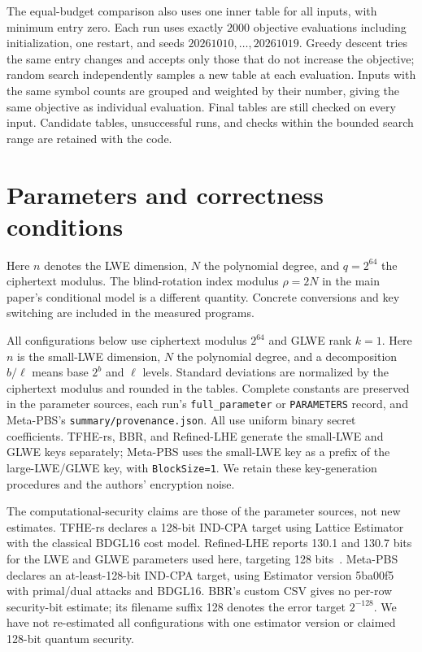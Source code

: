 \documentclass[11pt,a4paper]{article}
\begin{document}
The equal-budget comparison also uses one inner table for all inputs, with minimum entry zero. Each run uses exactly $2000$ objective evaluations including initialization, one restart, and seeds $20261010,\ldots,20261019$. Greedy descent tries the same entry changes and accepts only those that do not increase the objective; random search independently samples a new table at each evaluation. Inputs with the same symbol counts are grouped and weighted by their number, giving the same objective as individual evaluation. Final tables are still checked on every input. Candidate tables, unsuccessful runs, and checks within the bounded search range are retained with the code.



\section{Parameters and correctness conditions}\label{app:parameters}
Here $n$ denotes the LWE dimension, $N$ the polynomial degree, and $q=2^{64}$ the ciphertext modulus. The blind-rotation index modulus $\rho=2N$ in the main paper's conditional model is a different quantity. Concrete conversions and key switching are included in the measured programs.

All configurations below use ciphertext modulus $2^{64}$ and GLWE rank $k=1$. Here $n$ is the small-LWE dimension, $N$ the polynomial degree, and a decomposition $b/\ell$ means base $2^b$ and $\ell$ levels. Standard deviations are normalized by the ciphertext modulus and rounded in the tables. Complete constants are preserved in the parameter sources, each run's \texttt{full\_parameter} or \texttt{PARAMETERS} record, and Meta-PBS's \texttt{summary/provenance.json}. All use uniform binary secret coefficients. TFHE-rs, BBR, and Refined-LHE generate the small-LWE and GLWE keys separately; Meta-PBS uses the small-LWE key as a prefix of the large-LWE/GLWE key, with \texttt{BlockSize=1}. We retain these key-generation procedures and the authors' encryption noise.

The computational-security claims are those of the parameter sources, not new estimates. TFHE-rs declares a 128-bit IND-CPA target using Lattice Estimator with the classical BDGL16 cost model. Refined-LHE reports 130.1 and 130.7 bits for the LWE and GLWE parameters used here, targeting 128 bits~\cite{WHSLCWL25}. Meta-PBS declares an at-least-128-bit IND-CPA target, using Estimator version 5ba00f5 with primal/dual attacks and BDGL16. BBR's custom CSV gives no per-row security-bit estimate; its filename suffix 128 denotes the error target $2^{-128}$. We have not re-estimated all configurations with one estimator version or claimed 128-bit quantum security.
\end{document}
